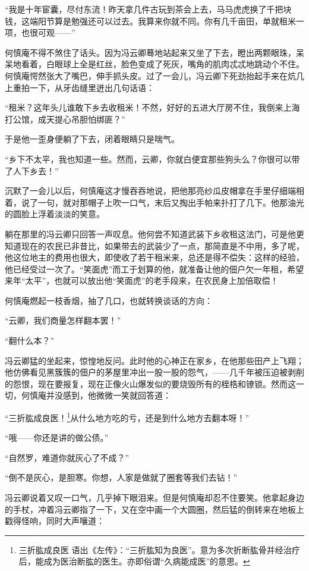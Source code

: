 \par “我是十年宦囊，尽付东流！昨天拿几件古玩到茶会上去，马马虎虎换了千把块钱，这端阳节算是勉强还可以过去。我算来你就不同。你有几千亩田，单就租米一项，也很可观——”
\par 何慎庵不得不煞住了话头。因为冯云卿蓦地站起来又坐了下去，瞪出两颗眼珠，呆呆地看着，白眼球上全是红丝，脸色变成了死灰，嘴角的肌肉忒忒地跳动个不住。何慎庵愕然张大了嘴巴，伸手抓头皮。过了一会儿，冯云卿下死劲抬起手来在炕几上重拍一下，从牙齿缝里迸出几句话语：
\par “租米？这年头儿谁敢下乡去收租米！不然，好好的五进大厅房不住，我倒来上海打公馆，成天提心吊胆怕绑匪？”
\par 于是他一歪身便躺了下去，闭着眼睛只是喘气。
\par “乡下不太平，我也知道一些。然而，云卿，你就白便宜那些狗头么？你很可以带了人下乡去！”
\par 沉默了一会儿以后，何慎庵这才慢吞吞地说，把他那亮纱瓜皮帽拿在手里仔细端相着，说了一句，就对那帽子上吹一口气，末后又掏出手帕来扑打了几下。他那油光的圆脸上浮着淡淡的笑意。
\par 躺在那里的冯云卿只回答一声叹息。他何尝不知道武装下乡收租这法门，可是他更知道现在的农民已非昔比，如果带去的武装少了一点，那简直是不中用，多了呢，他这位地主的费用也很大，即使收了若干租米来，总还是得不偿失：这样的经验，他已经受过一次了。“笑面虎”而工于划算的他，就准备让他的佃户欠一年租，希望来年“太平”，也就可以放出他“笑面虎”的老手段来，在农民身上加倍取偿！
\par 何慎庵燃起一枝香烟，抽了几口，也就转换谈话的方向：
\par “云卿，我们商量怎样翻本罢！”
\par “翻什么本？”
\par 冯云卿猛的坐起来，惊惶地反问。此时他的心神正在家乡，在他那些田产上飞翔；他仿佛看见黑簇簇的佃户的茅屋里冲出一股一股的怨气，——几千年被压迫被剥削的怨恨，现在要报复，现在正像火山爆发似的要烧毁所有的桎梏和镣锁。然而这一切，何慎庵并没感到，他微微一笑就回答道：
\par “三折肱成良医！\footnote{三折肱成良医 语出《左传》：“三折肱知为良医”。意为多次折断肱骨并经治疗后，能成为医治断肱的医生。亦即俗谓“久病能成医”的意思。}从什么地方吃的亏，还是到什么地方去翻本呀！”
\par “哦——你还是讲的做公债。”
\par “自然罗，难道你就灰心了不成？”
\par “倒不是灰心，是胆寒。你想，人家是做就了圈套等我们去钻！”
\par 冯云卿说着又叹一口气，几乎掉下眼泪来。但是何慎庵却忍不住要笑。他拿起身边的手杖，冲着冯云卿指了一下，又在空中画一个大圆圈，然后猛的倒转来在地板上戳得怪响，同时大声嚷道：
